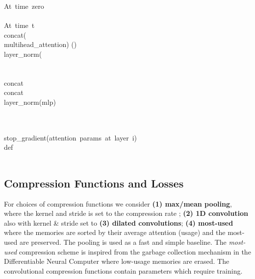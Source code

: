 \documentclass{article} \usepackage{iclr2020_conference,times}
\newcommand{\model}{Compressive Transformer}
\begin{document}
\begin{algorithm}
    \caption{\model}
    \label{alg:model}
    \begin{algorithmic}[1] 
    \hbox{At time zero}
    \STATE  {} \\
    \STATE  {} \\
    \hbox{At time t}
    \STATE  {} \\
        \STATE  \hbox{concat}(    \COMMENT{()} \\
        \STATE  \hbox{multihead\_attention})  ()\\
        \STATE  \hbox{layer\_norm}( \\
        \STATE  {}\\
        \STATE   {} \\
        \STATE  \hbox{concat} \\
        \STATE  \hbox{concat}  \\
        \STATE  \hbox{layer\_norm(mlp}) \\
    \ENDFOR 
    \end{algorithmic}
\end{algorithm}
\begin{algorithm}
    \caption{Attention-Reconstruction Loss}
    \label{alg:loss}
    \begin{algorithmic}[1] 
    \STATE 
        \STATE  {}\\
        \STATE   {} \\
        \STATE  \hbox{stop\_gradient(attention params at layer i)} \\
        \STATE def   \\
        \STATE   {} \\
        \STATE 
    \ENDFOR 
    \end{algorithmic}
\end{algorithm}
\subsection{Compression Functions and Losses}
For choices of compression functions  we consider \textbf{(1) max/mean pooling}, where the kernel and stride is set to the compression rate ; \textbf{(2) 1D convolution} also with kernel \& stride set to  \textbf{(3) dilated convolutions}; \textbf{(4) most-used} where the memories are sorted by their average attention (usage) and the most-used are preserved. The pooling is used as a fast and simple baseline. The \textit{most-used} compression scheme is inspired from the garbage collection mechanism in the Differentiable Neural Computer \citep{graves2016hybrid} where low-usage memories are erased. The convolutional compression functions contain parameters which require training.
\end{document}
